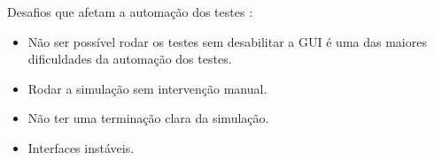 Desafios que afetam a automação dos testes \cite{robotSimulation}:
\begin{itemize}
    \item Não ser possível rodar os testes sem desabilitar a GUI é uma das maiores dificuldades da automação dos testes.
    \item Rodar a simulação sem intervenção manual.
    \item Não ter uma terminação clara da simulação.
    \item Interfaces instáveis.
\end{itemize}
